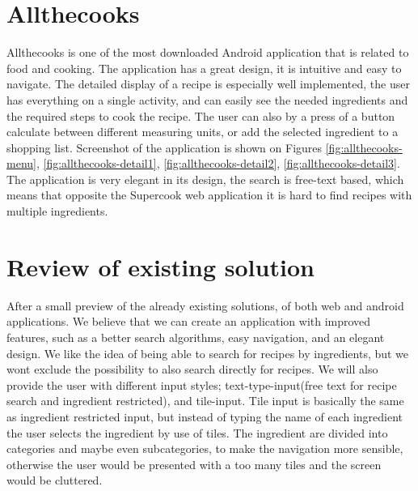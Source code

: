 \section{Allthecooks}
Allthecooks is one of the most downloaded \cite{allthecooks-googleplay} Android application that is related to food and cooking. The application has a great design, it is intuitive and easy to navigate. The detailed display of a recipe is especially well implemented, the user has everything on a single activity, and can easily see the needed ingredients and the required steps to cook the recipe. The user can also by a press of a button calculate between different measuring units, or add the selected ingredient to a shopping list. Screenshot of the application is shown on Figures \ref{fig:allthecooks-menu}, \ref{fig:allthecooks-detail1}, \ref{fig:allthecooks-detail2}, \ref{fig:allthecooks-detail3}. The application is very elegant in its design, the search is free-text based, which means that opposite the Supercook web application it is hard to find recipes with multiple ingredients.

\section{Review of existing solution}
After a small preview of the already existing solutions, of both web and android applications. We believe that we can create an application with improved features, such as a better search algorithms, easy navigation, and an elegant design. We like the idea of being able to search for recipes by ingredients, but we wont exclude the possibility to also search directly for recipes. We will also provide the user with different input styles; text-type-input(free text for recipe search and ingredient restricted), and tile-input. Tile input is basically the same as ingredient restricted input, but instead of typing the name of each ingredient the user selects the ingredient by use of tiles. The ingredient are divided into categories and maybe even subcategories, to make the navigation more sensible, otherwise the user would be presented with a too many tiles and the screen would be cluttered.

